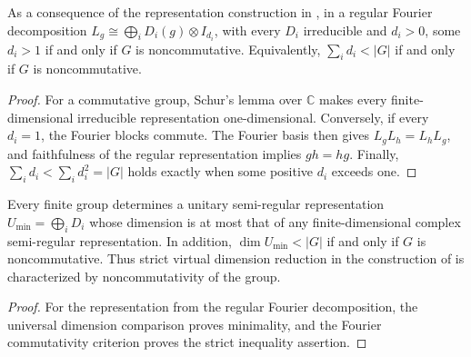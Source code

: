 \begin{lemma}
    \label{thm:peps_fourier_commutativity}
    \leanok
    As a consequence of the representation construction in
    \cite[Section~7]{Schuch2010PEPS}, in a regular Fourier decomposition
    $L_g\cong\bigoplus_iD_i(g)\otimes I_{d_i}$, with every $D_i$
    irreducible and $d_i>0$, some $d_i>1$ if and only if $G$ is
    noncommutative. Equivalently, $\sum_i d_i<|G|$ if and only if
    $G$ is noncommutative.
\end{lemma}
\begin{proof}\leanok
    For a commutative group, Schur's lemma over $\mathbb C$ makes every
    finite-dimensional irreducible representation one-dimensional.
    Conversely, if every $d_i=1$, the Fourier blocks commute.
    The Fourier basis then gives $L_gL_h=L_hL_g$, and faithfulness of
    the regular representation implies $gh=hg$.
    Finally, $\sum_i d_i<\sum_i d_i^2=|G|$ holds exactly when some
    positive $d_i$ exceeds one.
\end{proof}

\begin{lemma}
    \label{thm:peps_smallest_semiregular_strict_dimension}
    \leanok
    Every finite group determines a unitary semi-regular representation
    $U_{\min}=\bigoplus_iD_i$ whose dimension is at most that of any
    finite-dimensional complex semi-regular representation.
    In addition, $\dim U_{\min}<|G|$ if and only if $G$ is noncommutative.
    Thus strict virtual dimension reduction in the construction of
    \cite[Section~7]{Schuch2010PEPS} is characterized by
    noncommutativity of the group.
\end{lemma}
\begin{proof}\leanok
    For the representation from the regular Fourier decomposition,
    the universal dimension comparison proves minimality, and the Fourier
    commutativity criterion proves the strict inequality assertion.
\end{proof}
